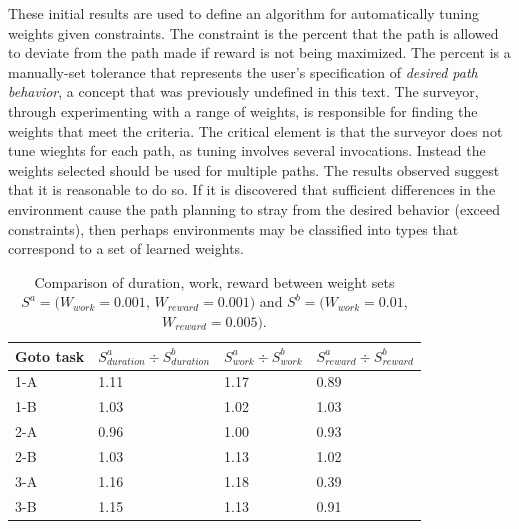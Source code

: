 \documentclass{tamuccthesis}
\begin{document}
These initial results are used to define an algorithm for automatically tuning weights given constraints. The constraint is the percent that the path is allowed to deviate from the path made if reward is not being maximized. The percent is a manually-set tolerance that represents the user's specification of \textit{desired path behavior}, a concept that was previously undefined in this text. The surveyor, through experimenting with a range of weights, is responsible for finding the weights that meet the criteria. The critical element is that the surveyor does not tune wieghts for each path, as tuning involves several  invocations. Instead the weights selected should be used for multiple paths. The results observed suggest that it is reasonable to do so. If it is discovered that sufficient differences in the environment cause the path planning to stray from the desired behavior (exceed constraints), then perhaps environments may be classified into types that correspond to a set of learned weights. 


\begin{table}[H]
    \begin{tabular}{|l|l|l|l|}
        \hline
        Goto task & $S^a_{duration} \div S^b_{duration}$ & $S^a_{work} \div S^b_{work}$ & $S^a_{reward} \div S^b_{reward}$ \\
        \hline
        1-A & 1.11 & 1.17 & 0.89 \\
        \hline
        1-B & 1.03 & 1.02 & 1.03 \\
        \hline
        2-A & 0.96 & 1.00 & 0.93 \\
        \hline
        2-B & 1.03 & 1.13 & 1.02 \\
        \hline
        3-A & 1.16 & 1.18 & 0.39 \\
        \hline
        3-B &  1.15 & 1.13 & 0.91 \\
        \hline
    \end{tabular}
    \caption[Varying optimization criteria weights, weight sets $S^a$ and $S^b$.]{Comparison of duration, work, reward between weight sets $S^a = (W_{work} = 0.001$, $W_{reward} = 0.001)$ and $S^b = (W_{work} = 0.01$, $W_{reward} = 0.005)$.}
    \label{tbl:weightDiff_a_b}
\end{table}
\end{document}

